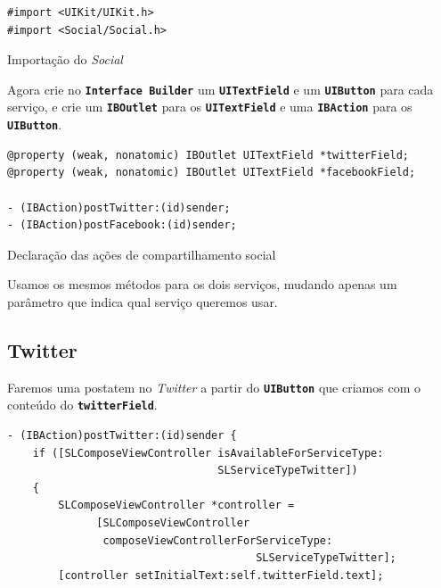 \documentclass[a4paper,12pt,brazil,doubleside]{book}
\begin{document}
\begin{singlespace}
\begin{listing}[H]
\begin{verbatim}
#import <UIKit/UIKit.h>
#import <Social/Social.h>
\end{verbatim}
\caption{Importação do \emph{Social}}
\end{listing}


Agora crie no \texttt{\textbf{Interface Builder}} um \texttt{\textbf{UITextField}} e um \texttt{\textbf{UIButton}} para cada serviço, e crie um \texttt{\textbf{IBOutlet}} para os \texttt{\textbf{UITextField}} e uma \texttt{\textbf{IBAction}} para os \texttt{\textbf{UIButton}}.

\begin{listing}[H]
\begin{verbatim}
@property (weak, nonatomic) IBOutlet UITextField *twitterField;
@property (weak, nonatomic) IBOutlet UITextField *facebookField;

- (IBAction)postTwitter:(id)sender;
- (IBAction)postFacebook:(id)sender;
\end{verbatim}
\caption{Declaração das ações de compartilhamento social}
\end{listing}


Usamos os mesmos métodos para os dois serviços, mudando apenas um parâmetro que indica qual serviço queremos usar.

\bigskip

\subsection{Twitter}


Faremos uma postatem no \emph{Twitter} a partir do \texttt{\textbf{UIButton}} que criamos com o conteúdo do \texttt{\textbf{twitterField}}. 

\begin{listing}[H]
\begin{verbatim}
- (IBAction)postTwitter:(id)sender {
    if ([SLComposeViewController isAvailableForServiceType:
                                 SLServiceTypeTwitter])
    {
        SLComposeViewController *controller = 
              [SLComposeViewController
               composeViewControllerForServiceType:
                                       SLServiceTypeTwitter];
        [controller setInitialText:self.twitterField.text];
        

\end{verbatim}
\end{listing}
\end{singlespace}
\end{document}
